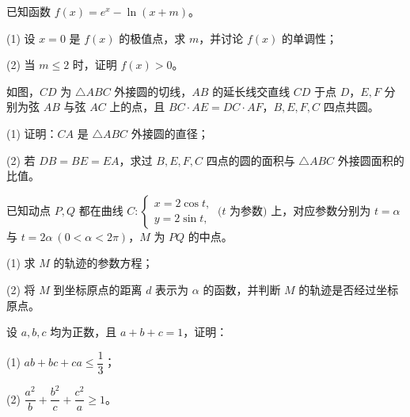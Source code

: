 \begin{question}
已知函数 $f(x)=e^x-\ln(x+m)$。

(1) 设 $x=0$ 是 $f(x)$ 的极值点，求 $m$，并讨论 $f(x)$ 的单调性；

(2) 当 $m\leqslant2$ 时，证明 $f(x)>0$。

\Needspace{0.4\textheight}
\end{question}
\begin{question}
如图，$CD$ 为 $\triangle ABC$ 外接圆的切线，$AB$ 的延长线交直线 $CD$ 于点 $D$，$E,F$ 分别为弦 $AB$ 与弦 $AC$ 上的点，且 $BC\cdot AE=DC\cdot AF$，$B,E,F,C$ 四点共圆。
\nopagebreak[4]
\begin{center}\end{center}
\nopagebreak[4]
(1) 证明：$CA$ 是 $\triangle ABC$ 外接圆的直径；

(2) 若 $DB=BE=EA$，求过 $B,E,F,C$ 四点的圆的面积与 $\triangle ABC$ 外接圆面积的比值。

\end{question}
\begin{question}
已知动点 $P,Q$ 都在曲线 $C:\begin{cases}x=2\cos t,\\y=2\sin t,\end{cases}\ (t$ 为参数$)$ 上，对应参数分别为 $t=\alpha$ 与 $t=2\alpha\ (0<\alpha<2\pi)$，$M$ 为 $PQ$ 的中点。

(1) 求 $M$ 的轨迹的参数方程；

(2) 将 $M$ 到坐标原点的距离 $d$ 表示为 $\alpha$ 的函数，并判断 $M$ 的轨迹是否经过坐标原点。

\end{question}
\begin{question}
设 $a,b,c$ 均为正数，且 $a+b+c=1$，证明：

(1) $ab+bc+ca\leqslant\dfrac13$；

(2) $\dfrac{a^2}{b}+\dfrac{b^2}{c}+\dfrac{c^2}{a}\geqslant1$。

\end{question}